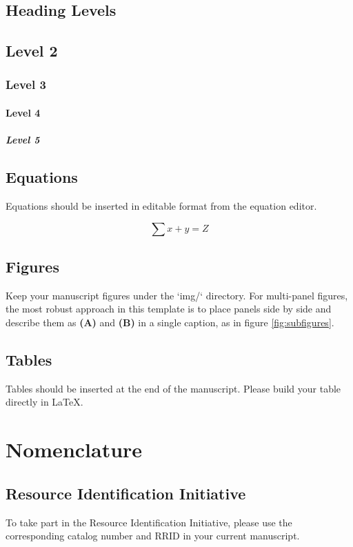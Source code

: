 \documentclass[utf8]{FrontiersinHarvard}
\begin{document}
\subsection{Heading Levels}
\subsection{Level 2}
\subsubsection{Level 3}
\paragraph{Level 4}
\subparagraph{Level 5}

\subsection{Equations}
Equations should be inserted in editable format from the equation editor.

\begin{equation}
\sum x + y = Z
\label{eq:01}
\end{equation}

\subsection{Figures}
Keep your manuscript figures under the `img/` directory. For multi-panel figures, the most robust approach in this template is to place panels side by side and describe them as \textbf{(A)} and \textbf{(B)} in a single caption, as in figure \ref{fig:subfigures}.

\subsection{Tables}
Tables should be inserted at the end of the manuscript. Please build your table directly in LaTeX.

\section{Nomenclature}

\subsection{Resource Identification Initiative}
To take part in the Resource Identification Initiative, please use the corresponding catalog number and RRID in your current manuscript.
\end{document}
